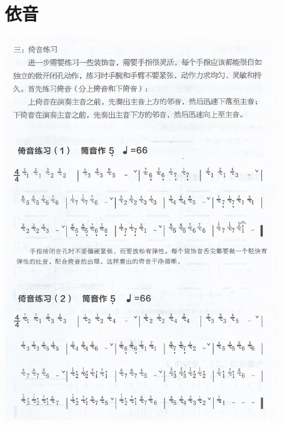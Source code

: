 \documentclass[cn,pad,twocol]{elegantbook}
\begin{document}
\section{依音}
    \includegraphics[width=0.9\textwidth]{dongxiao/Scan 9.jpeg}
\end{document}
